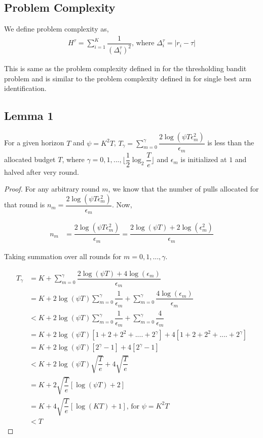 

\subsection{Problem Complexity}

We define problem complexity as,
\begin{align*}
H^{\tau} = \sum_{i=1}^{K}\dfrac{1}{(\Delta_{i}^{\tau})^{2}} \text{, where } \Delta_{i}^{\tau}=|r_{i}-\tau|
\end{align*}

This is same as the problem complexity defined in \cite{locatelli2016optimal} for the thresholding bandit problem and is similar to the problem complexity defined in \cite{audibert2010best} for single best arm identification.

\subsection{Lemma 1} For a given horizon $T$ and $\psi=K^{2}T$, $T_{\gamma} = \sum_{m=0}^{\gamma}\dfrac{2\log(\psi T \epsilon_{m}^{2})}{\epsilon_{m}}$ is less than the allocated budget $T$, where $\gamma=0,1,...,\big\lfloor \dfrac{1}{2}\log_{2} \dfrac{T}{e}\big\rfloor$ and $\epsilon_{m}$ is initialized at $1$ and halved after very round. 

\begin{proof}
For any arbitrary round $m$, we know that the number of pulls allocated for that round is 
$n_{m} = \dfrac{2\log(\psi T \epsilon_{m}^{2})}{\epsilon_{m}}$. Now, 

\begin{align*}
n_{m} &= \dfrac{2\log(\psi T \epsilon_{m}^{2})}{\epsilon_{m}}
= \dfrac{2\log(\psi T) + 2\log(\epsilon_{m}^{2})}{\epsilon_{m}}
\end{align*}

Taking summation over all rounds for $m=0,1,...,\gamma$. 

\begin{align*}
T_{\gamma} &= K+\sum_{m=0}^{\gamma}\dfrac{2\log(\psi T) + 4\log(\epsilon_{m})}{\epsilon_{m}}\\
&= K+2\log (\psi T)\sum_{m=0}^{\gamma}\dfrac{1}{\epsilon_{m}} + \sum_{m=0}^{\gamma}\dfrac{4\log (\epsilon_{m})}{\epsilon_{m}}\\
&< K+2\log (\psi T)\sum_{m=0}^{\gamma}\dfrac{1}{\epsilon_{m}} + \sum_{m=0}^{\gamma}\dfrac{4}{\epsilon_{m}}\\
&= K+2\log (\psi T)[1+2+2^{2}+....+2^{\gamma}] + 4[1+2+2^{2}+....+2^{\gamma}]\\
&= K+2\log (\psi T)[2^{\gamma} - 1] + 4[2^{\gamma} - 1]\\
&< K+2\log (\psi T)\sqrt{\dfrac{T}{e}} + 4\sqrt{\dfrac{T}{e}}\\
&= K+2\sqrt{\dfrac{T}{e}}[\log (\psi T) + 2]\\
&= K+4\sqrt{\dfrac{T}{e}}[\log (K T) + 1] \text{, for } \psi=K^{2}T\\
&< T
\end{align*}


\end{proof}


